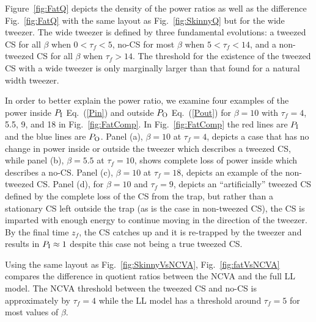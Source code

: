 Figure~\ref{fig:FatQ} depicts the density of the power ratios as well as the difference Fig.~\ref{fig:FatQ} with the same layout as Fig.~\ref{fig:SkinnyQ} but for the wide tweezer.  The wide tweezer is defined by three fundamental evolutions: a tweezed CS for all $\beta$ when $0<\tau_f < 5$, no-CS for most $\beta$ when $5<\tau_f <14$, and a non-tweezed CS for all $\beta$ when $\tau_f > 14$.  The threshold for the existence of the tweezed CS with a wide tweezer is only marginally larger than that found for a natural width tweezer.

In order to better explain the power ratio, we examine four examples of the power inside $P_{\rm I}$ Eq.~(\ref{Pin}) and outside $P_{\rm O}$ Eq.~(\ref{Pout}) for $\beta = 10$ with $\tau_f = 4$, 5.5, 9, and 18 in Fig.~\ref{fig:FatComp}.  In Fig.~\ref{fig:FatComp} the red lines are $P_{\rm I}$ and the blue lines are $P_{\rm O}$.  Panel (a), $\beta = 10$ at $\tau_f = 4$, depicts a case that has no change in power inside or outside the tweezer which describes a tweezed CS, while panel (b), $\beta = 5.5$ at $\tau_f = 10$, shows complete loss of power inside which describes a no-CS.  Panel (c), $\beta = 10$ at $\tau_f = 18$, depicts an example of the non-tweezed CS.  Panel (d), for $\beta = 10$ and $\tau_f = 9$, depicts an ``artificially'' tweezed CS defined by the complete loss of the CS from the trap, but rather than a stationary CS left outside the trap (as is the case in non-tweezed CS), the CS is imparted with enough energy to continue moving in the direction of the tweezer.  By the final time $z_f$, the CS catches up and it is re-trapped by the tweezer and results in $P_{\rm I} \approx 1$ despite this case not being a true tweezed CS. 

Using the same layout as Fig.~\ref{fig:SkinnyVsNCVA}, Fig.~\ref{fig:fatVsNCVA} compares the difference in quotient ratios between the NCVA and the full LL model.  The NCVA threshold between the tweezed CS and no-CS is approximately by $\tau_f = 4$ while the LL model has a threshold around $\tau_f = 5$ for most values of $\beta$.  

